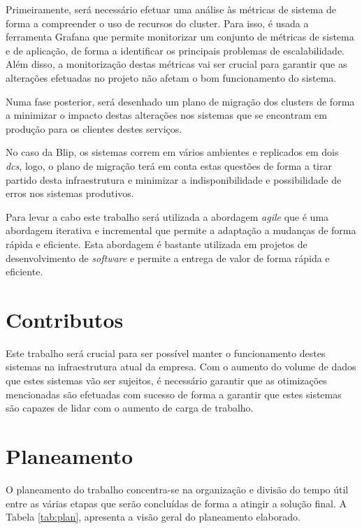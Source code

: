 Primeiramente, será necessário efetuar uma análise às métricas de sistema de forma a compreender
o uso de recursos do \gls{cluster}. Para isso, é usada a ferramenta Grafana que permite
monitorizar um conjunto de métricas de sistema e de aplicação, de forma a identificar os principais
problemas de escalabilidade. Além disso, a monitorização destas métricas vai ser crucial para
garantir que as alterações efetuadas no projeto não afetam o bom funcionamento do sistema.

Numa fase posterior, será desenhado um plano de migração dos \glspl{cluster} de forma a minimizar 
o impacto destas alterações nos sistemas que se encontram em produção para os clientes destes 
serviços.

No caso da Blip, os sistemas correm em vários ambientes e replicados em dois \textit{\glspl{dc}},
logo, o plano de migração terá em conta estas questões de forma a tirar partido desta infraestrutura
e minimizar a indisponibilidade e possibilidade de erros nos sistemas produtivos.

Para levar a cabo este trabalho será utilizada a abordagem \textit{agile} que é uma abordagem
iterativa e incremental que permite a adaptação a mudanças de forma rápida e eficiente. Esta abordagem
é bastante utilizada em projetos de desenvolvimento de \textit{software} e permite a entrega de valor
de forma rápida e eficiente.

\section{Contributos}

Este trabalho será crucial para ser possível manter o funcionamento destes sistemas na
infraestrutura atual da empresa. Com o aumento do volume de dados que estes sistemas vão ser 
sujeitos, é necessário garantir que as otimizações mencionadas são efetuadas com sucesso de forma
a garantir que estes sistemas são capazes de lidar com o aumento de carga de trabalho.

\section{Planeamento}

O planeamento do trabalho concentra-se na organização e divisão do tempo útil entre as várias etapas
que serão concluídas de forma a atingir a solução final. A Tabela \ref{tab:plan}, apresenta a visão
geral do planeamento elaborado.

